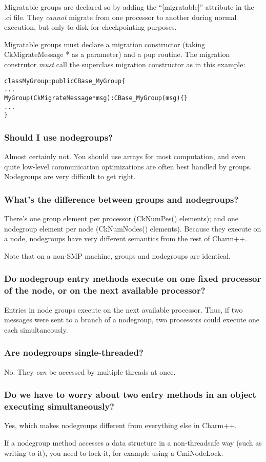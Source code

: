 Migratable groups are declared so by adding the ``[migratable]'' attribute in
the .ci file. They {\em cannot} migrate from one processor to another during
normal execution, but only to disk for checkpointing purposes.

Migratable groups must declare a migration constructor (taking
\textrm{CkMigrateMessage *} as a parameter) and a pup routine. The migration
construtor {\em must} call the superclass migration constructor as in this
example:
\begin{alltt}
class MyGroup : public CBase\_MyGroup \{
  ...
  MyGroup (CkMigrateMessage *msg) : CBase\_MyGroup(msg) \{ \}
  ...
\}
\end{alltt}

\subsubsection{Should I use nodegroups?}

Almost certainly not. You should use arrays for most computation, and
even quite low-level communication optimizations are often best handled
by groups. Nodegroups are very difficult to get right.

\subsubsection{What's the difference between groups and nodegroups?}

There's one group element per processor (CkNumPes() elements); and
one nodegroup element per node (CkNumNodes() elements). Because they
execute on a node, nodegroups have very different semantics from the rest
of Charm++.

Note that on a non-SMP machine, groups and nodegroups are identical.


\subsubsection{Do nodegroup entry methods execute on one fixed processor of the node,
or on the next available processor?}

Entries in node groups execute on the next available processor. Thus,
if two messages were sent to a branch of a nodegroup, two processors could
execute one each simultaneously.

\subsubsection{Are nodegroups single-threaded?}

No. They {\em can} be accessed by multiple threads at once.

\subsubsection{Do we have to worry about two entry methods in an object executing simultaneously?}

Yes, which makes nodegroups different from everything else in Charm++.

If a nodegroup method accesses a data structure in a non-threadsafe
way (such as writing to it), you need to lock it, for example using a CmiNodeLock.
